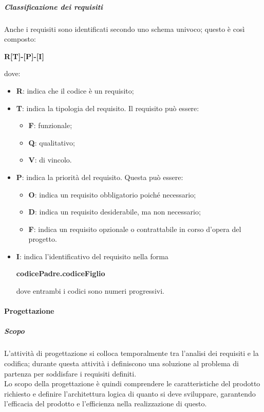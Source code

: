 \documentclass[../norme-di-progetto.tex]{subfiles}
\begin{document}
\subparagraph{Classificazione dei requisiti}
Anche i requisiti sono identificati secondo uno schema univoco; questo è così composto: \\
\begin{center}
  \centering
  \textbf{R[T]-[P]-[I]}
\end{center} dove:
\begin{itemize}
  \item \textbf{R}: indica che il codice è un requisito;
  \item \textbf{T}: indica la tipologia del requisito. Il requisito può essere:
  \begin{itemize}
    \item \textbf{F}: funzionale;
    \item \textbf{Q}: qualitativo;
    \item \textbf{V}: di vincolo.
  \end{itemize}
  \item \textbf{P}: indica la priorità del requisito. Questa può essere:
  \begin{itemize}
    \item \textbf{O}: indica un requisito obbligatorio poiché necessario;
    \item \textbf{D}: indica un requisito desiderabile, ma non necessario;
    \item \textbf{F}: indica un requisito opzionale o contrattabile in corso d'opera del progetto.
  \end{itemize}
  \item \textbf{I}: indica l'identificativo del requisito nella forma \\
  \begin{center}
    \centering
    \textbf{codicePadre.codiceFiglio}
  \end{center} dove entrambi i codici sono numeri progressivi.
\end{itemize}


\paragraph{Progettazione}
\subparagraph{Scopo}
L'attività di progettazione si colloca temporalmente tra l'analisi dei requisiti e la codifica; durante questa attività i  definiscono una soluzione al problema di partenza per soddisfare i requisiti definiti. \\
Lo scopo della progettazione è quindi comprendere le caratteristiche del prodotto richiesto e definire l'architettura logica di quanto si deve sviluppare, garantendo l'efficacia del prodotto e l'efficienza nella realizzazione di questo.
\end{document}
